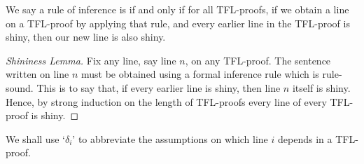\begin{definition}
    We say a rule of inference is  if and only if for all TFL-proofs, if we obtain a line on a TFL-proof by applying that rule, and every earlier line in the TFL-proof is shiny, then our new line is also shiny.
\end{definition}


\begin{proof}[Shininess Lemma]
    Fix any line, say line $n$, on any TFL-proof. The sentence written on line $n$ must be obtained using a formal inference rule which is rule-sound. This is to say that, if every earlier line is shiny, then line $n$ itself is shiny. Hence, by strong induction on the length of TFL-proofs every line of every TFL-proof is shiny.
\end{proof}

\begin{remark}
    We shall use `$\delta_i$' to abbreviate the assumptions on which line $i$ depends in a TFL-proof.
\end{remark}

